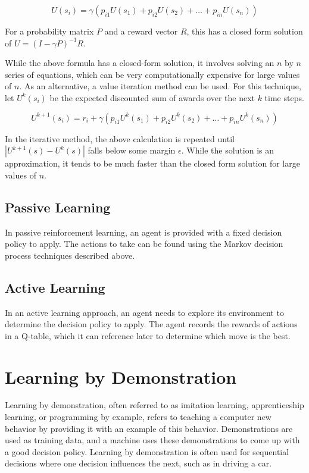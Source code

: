 \documentclass[12pt,titlepage]{article}
\let\stdsection\section
\renewcommand\section{\clearpage\stdsection}
\begin{document}
      $$U(s_i) = \gamma(p_{i1}U(s_1) + p_{i2}U(s_2) + \dots + p_{in}U(s_n))$$

      For a probability matrix $P$ and a reward vector $R$, this has a closed form solution of $U = (I - \gamma P)^{-1}R$.

      While the above formula has a closed-form solution, it involves solving an $n$ by $n$ series of equations, which can be very computationally expensive for large values
      of $n$. As an alternative, a value iteration method can be used. For this technique, let $U^k(s_i)$ be the expected discounted sum of awards over the next $k$ time steps.

      $$U^{k+1}(s_i) = r_i + \gamma(p_{i1}U^k(s_1) + p_{i2}U^k(s_2) + \dots + p_{in}U^k(s_n))$$

      In the iterative method, the above calculation is repeated until $|U^{k+1}(s) - U^k(s)|$ falls below some margin $\epsilon$. While the solution is an approximation, it
      tends to be much faster than the closed form solution for large values of $n$.

    \subsection{Passive Learning}
      In passive reinforcement learning, an agent is provided with a fixed decision policy to apply. The actions to take can be found using the Markov decision process techniques
      described above.

    \subsection{Active Learning}
      In an active learning approach, an agent needs to explore its environment to determine the decision policy to apply. The agent records the rewards of actions in a Q-table,
      which it can reference later to determine which move is the best.

  \section{Learning by Demonstration}
    Learning by demonstration, often referred to as imitation learning, apprenticeship learning, or programming by example, refers to teaching a computer new behavior by
    providing it with an example of this behavior. Demonstrations are used as training data, and a machine uses these demonstrations to come up with a good decision policy.
    Learning by demonstration is often used for sequential decisions where one decision influences the next, such as in driving a car.
\end{document}
